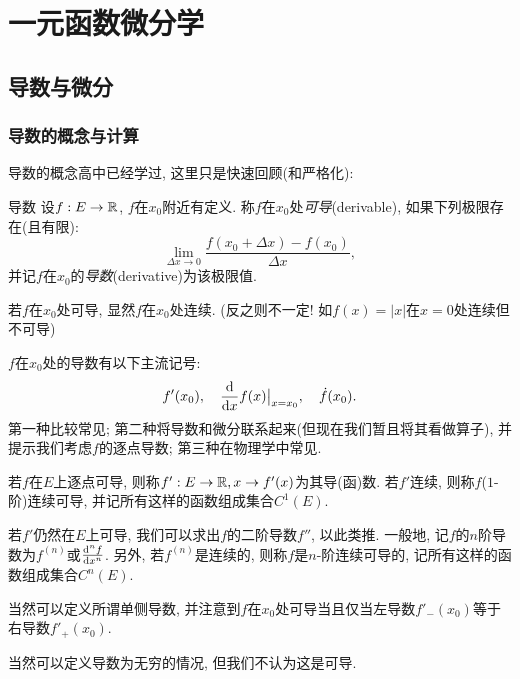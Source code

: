 \chapter{一元函数微分学}

\section{导数与微分}

\subsection{导数的概念与计算}

导数的概念高中已经学过, 这里只是快速回顾(和严格化): 

\begin{definition}{导数}
	设$f:E \to \mathbb{R}$, $f$在$x_0$附近有定义. 称$f$在$x_0$处\textit{可导}(derivable), 如果下列极限存在(且有限): 
	$$\lim_{\Delta x \to 0} \frac{f(x_0+\Delta x) - f(x_0)}{\Delta x}, $$
	并记$f$在$x_0$的\textit{导数}(derivative)为该极限值. 
\end{definition}
\begin{remark}
	若$f$在$x_0$处可导, 显然$f$在$x_0$处连续. (反之则不一定! 如$f(x)=|x|$在$x=0$处连续但不可导)
\end{remark}
\begin{remark}
	$f$在$x_0$处的导数有以下主流记号: $$f'(x_0),\quad \frac{\mathop{}\!\mathrm{d} }{\mathop{}\!\mathrm{d} x} f(x) \big|_{x=x_0},\quad \dot{f}(x_0). $$
	第一种比较常见; 第二种将导数和微分联系起来(但现在我们暂且将其看做算子), 并提示我们考虑$f$的逐点导数; 第三种在物理学中常见. 
\end{remark}
\begin{remark}
	若$f$在$E$上逐点可导, 则称$f':E \to \mathbb{R} ,x \to f'(x)$为其导(函)数. 若$f'$连续, 则称$f$($1$-阶)连续可导, 并记所有这样的函数组成集合$C^1(E)$. 
\end{remark}
\begin{remark}
	若$f'$仍然在$E$上可导, 我们可以求出$f$的二阶导数$f''$, 以此类推. 一般地, 记$f$的$n$阶导数为$f^{(n)}$或$\frac{\mathop{}\!\mathrm{d} ^n f}{\mathop{}\!\mathrm{d} x^n}$. 另外, 若$f^{(n)}$是连续的, 则称$f$是$n$-阶连续可导的, 记所有这样的函数组成集合$C^{n}(E)$. 
\end{remark}
\begin{remark}
	当然可以定义所谓单侧导数, 并注意到$f$在$x_0$处可导当且仅当左导数$f'_-(x_0)$等于右导数$f'_+(x_0)$. 
\end{remark}
\begin{remark}
	当然可以定义导数为无穷的情况, 但我们不认为这是可导. 
\end{remark}

